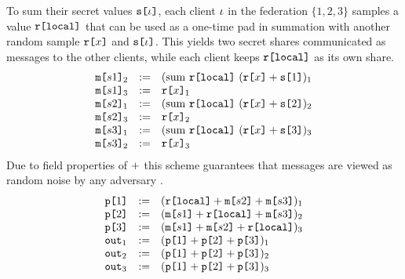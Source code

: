 To sum their secret values $\texttt{s[}\iota\texttt{]}$, each client $\iota$ in
the federation $\{ 1, 2, 3 \}$  samples a value $\texttt{r[}\mathtt{local}\texttt{]}$
that can be used as a one-time pad in summation with another
random sample $\texttt{r[}x\texttt{]}$ and $\texttt{s[}\iota\texttt{]}$. This yields
two secret shares communicated as messages to the other clients,
while each client keeps $\texttt{r[}\mathtt{local}\texttt{]}$ as its own share.
$$
\begin{array}{lll}
  \texttt{m[}s1\texttt{]}_{2} &:=& (\mathrm{sum}\ \texttt{r[}\mathtt{local}\texttt{]}\ (\texttt{r[}x\texttt{]} + \texttt{s[}1\texttt{]})_{1} \\ 
  \texttt{m[}s1\texttt{]}_{3} &:=& \texttt{r[}x\texttt{]}_{1} \\ 
  \texttt{m[}s2\texttt{]}_{1} &:=& (\mathrm{sum}\ \texttt{r[}\mathtt{local}\texttt{]}\ (\texttt{r[}x\texttt{]} + \texttt{s[}2\texttt{]})_{2} \\ 
  \texttt{m[}s2\texttt{]}_{3} &:=& \texttt{r[}x\texttt{]}_{2} \\ 
  \texttt{m[}s3\texttt{]}_{1} &:=& (\mathrm{sum}\ \texttt{r[}\mathtt{local}\texttt{]}\ (\texttt{r[}x\texttt{]} + \texttt{s[}3\texttt{]})_{3} \\ 
  \texttt{m[}s3\texttt{]}_{2} &:=& \texttt{r[}x\texttt{]}_{3}
\end{array}
$$
Due to field properties of $+$ this scheme guarantees that messages
are viewed as random noise by any adversary \cite{barthe2019probabilistic}.
$$
\begin{array}{lll}
  \texttt{p[}1\texttt{]} &:=& (\texttt{r[}\mathtt{local}\texttt{]} + \texttt{m[}s2\texttt{]} + \texttt{m[}s3\texttt{]})_{1} \\ 
  \texttt{p[}2\texttt{]} &:=& (\texttt{m[}s1\texttt{]} + \texttt{r[}\mathtt{local}\texttt{]} + \texttt{m[}s3\texttt{]})_{2} \\
  \texttt{p[}3\texttt{]} &:=& (\texttt{m[}s1\texttt{]} + \texttt{m[}s2\texttt{]} + \texttt{r[}\mathtt{local}\texttt{]})_{3} \\ 
  \texttt{out}_{1} &:=& (\texttt{p[}1\texttt{]} + \texttt{p[}2\texttt{]} + \texttt{p[}3\texttt{]})_{1}\\
  \texttt{out}_{2} &:=& (\texttt{p[}1\texttt{]} + \texttt{p[}2\texttt{]} + \texttt{p[}3\texttt{]})_{2}\\
  \texttt{out}_{3} &:=& (\texttt{p[}1\texttt{]} + \texttt{p[}2\texttt{]} + \texttt{p[}3\texttt{]})_{3}
\end{array}
$$

